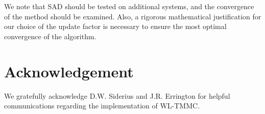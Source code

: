 \documentclass[letterpaper,twocolumn,amsmath,amssymb,pre,aps,10pt]{revtex4-1}
\newcommand{\blue}[1]{{\bf \color{blue} #1}}
\newcommand{\jpsays}[1]{{\color{red} [\blue{Jordan:} \emph{#1}]}}
\begin{document}
We note that SAD should be tested on additional systems, and the
convergence of the method should be examined.  Also, a rigorous
mathematical justification for our choice of the update factor is
necessary to ensure the most optimal convergence of the algorithm.

\section{Acknowledgement}

We gratefully acknowledge D.W. Siderius and
J.R. Errington for helpful communications regarding the implementation
of WL-TMMC.



\end{document}
